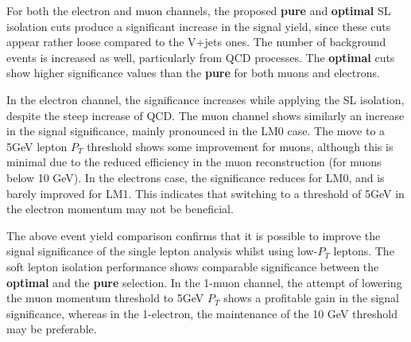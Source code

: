 For both the electron and muon channels, the proposed {\bf pure} and {\bf optimal} SL isolation cuts produce a significant increase in the signal yield, since these cuts appear rather loose compared to the V+jets ones. The number of background events is increased as well, particularly from QCD processes. The {\bf optimal} cuts show higher significance values than the {\bf pure} for both muons and electrons.

In the electron channel, the significance increases while applying the SL isolation, despite the steep increase of QCD. The muon channel shows similarly an increase in the signal significance, mainly pronounced in the LM0 case. The move to a 5GeV lepton $P_{T}$ threshold shows some improvement for muons, although this is minimal due to the reduced efficiency in the muon reconstruction (for muons below 10 GeV). In the electrons case, the significance reduces for LM0, and is barely improved for LM1. This indicates that switching to a threshold of 5GeV in the electron momentum may not be beneficial.

The above event yield comparison confirms that it is possible to improve the signal significance of the single lepton analysis whilst using low-$P_{T}$ leptons. The soft lepton isolation performance shows comparable significance between the {\bf optimal} and the {\bf pure} selection. In the 1-muon channel, the attempt of lowering the muon momentum threshold to 5GeV $P_{T}$ shows a profitable gain in the signal significance, whereas in the 1-electron, the maintenance of the 10 GeV threshold may be preferable.



